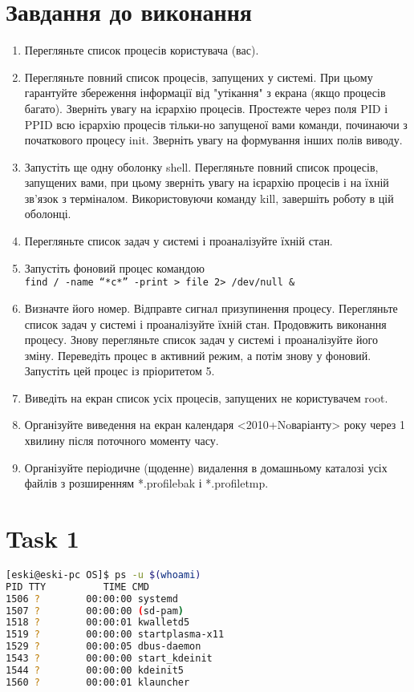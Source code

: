 \documentclass{article}
\begin{document}
 

\section*{Завдання до виконання}
\large
\begin{enumerate}
\item Перегляньте список процесів користувача (вас).
\item Перегляньте повний список процесів, запущених у системі. При цьому
гарантуйте збереження інформації від "утікання" з екрана (якщо
процесів багато). Зверніть увагу на ієрархію процесів. Простежте через
поля PID і PPID всю ієрархію процесів тільки-но запущеної вами
команди, починаючи з початкового процесу init. Зверніть увагу на
формування інших полів виводу.
\item Запустіть ще одну оболонку shell. Перегляньте повний список
процесів, запущених вами, при цьому зверніть увагу на ієрархію
процесів і на їхній зв'язок з терміналом. Використовуючи команду
kill, завершіть роботу в цій оболонці.
\item Перегляньте список задач у системі і проаналізуйте їхній стан.
\item Запустіть фоновий процес командою\\
\texttt{find / -name ``*c*'' -print > file 2> /dev/null \&}
\item Визначте його номер. Відправте сигнал призупинення процесу.
Перегляньте список задач у системі і проаналізуйте їхній стан.
Продовжить виконання процесу. Знову перегляньте список задач у
системі і проаналізуйте його зміну. Переведіть процес в активний
режим, а потім знову у фоновий. Запустіть цей процес із пріоритетом 5.
\item Виведіть на екран список усіх процесів, запущених не користувачем
root.
\item Організуйте виведення на екран календаря <2010+Noваріанту> року
через 1 хвилину після поточного моменту часу.
\item Організуйте періодичне (щоденне) видалення в домашньому каталозі
усіх файлів з розширенням *.profilebak і *.profiletmp.

\end{enumerate}

\newpage

\section*{Task 1}\vspace{-5mm}
		\begin{lstlisting}[language=BASH]
[eski@eski-pc OS]$ ps -u $(whoami)
PID TTY          TIME CMD
1506 ?        00:00:00 systemd
1507 ?        00:00:00 (sd-pam)
1518 ?        00:00:01 kwalletd5
1519 ?        00:00:00 startplasma-x11
1529 ?        00:00:05 dbus-daemon
1543 ?        00:00:00 start_kdeinit
1544 ?        00:00:00 kdeinit5
1560 ?        00:00:01 klauncher
		\end{lstlisting}
\end{document}
